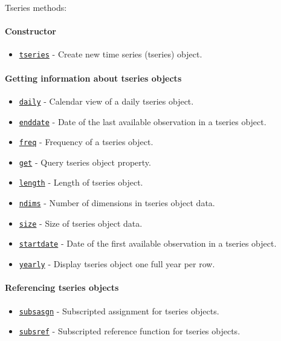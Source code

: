 

	Tseries methods:
 
 \paragraph{Constructor}
 
 \begin{itemize}
 \item
   \href{tseries/tseries}{\texttt{tseries}} - Create new time series
   (tseries) object.
 \end{itemize}
 
 \paragraph{Getting information about tseries objects}
 
 \begin{itemize}
 \item
   \href{tseries/daily}{\texttt{daily}} - Calendar view of a daily
   tseries object.
 \item
   \href{tseries/enddate}{\texttt{enddate}} - Date of the last available
   observation in a tseries object.
 \item
   \href{tseries/freq}{\texttt{freq}} - Frequency of a tseries object.
 \item
   \href{tseries/get}{\texttt{get}} - Query tseries object property.
 \item
   \href{tseries/length}{\texttt{length}} - Length of tseries object.
 \item
   \href{tseries/ndims}{\texttt{ndims}} - Number of dimensions in tseries
   object data.
 \item
   \href{tseries/size}{\texttt{size}} - Size of tseries object data.
 \item
   \href{tseries/startdate}{\texttt{startdate}} - Date of the first
   available observation in a tseries object.
 \item
   \href{tseries/yearly}{\texttt{yearly}} - Display tseries object one
   full year per row.
 \end{itemize}
 
 \paragraph{Referencing tseries objects}
 
 \begin{itemize}
 \item
   \href{tseries/subsasgn}{\texttt{subsasgn}} - Subscripted assignment
   for tseries objects.
 \item
   \href{tseries/subsref}{\texttt{subsref}} - Subscripted reference
   function for tseries objects.
 \end{itemize}
 
